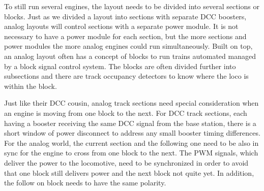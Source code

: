 \begin{center}
\end{center}

To still run several engines, the layout needs to be divided into several sections or blocks. Just as we divided a layout into sections with separate DCC boosters, analog layouts will control sections with a separate power module. It is not necessary to have a power module for each section, but the more sections and power modules the more analog engines could run simultaneously. Built on top, an analog layout often has a concept of blocks to run trains automated managed by a block signal control system. The blocks are often divided further into subsections and there are track occupancy detectors to know where the loco is within the block.

Just like their DCC cousin, analog track sections need special consideration when an engine is moving from one block to the next. For DCC track sections, each having a booster receiving the same DCC signal from the base station, there is a short window of power disconnect to address any small booster timing differences. For the analog world, the current section and the following one need to be also in sync for the engine to cross from one block to the next. The PWM signals, which deliver the power to the locomotive, need to be synchronized in order to avoid that one block still delivers power and the next block not quite yet. In addition, the follow on block needs to have the same polarity.

